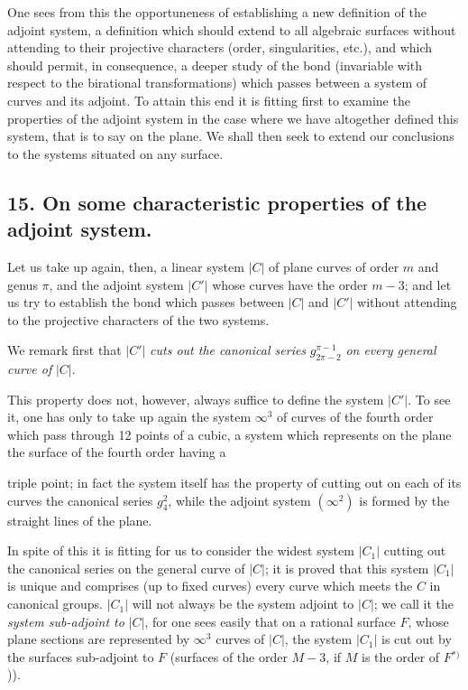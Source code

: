 \documentclass{article}
\begin{document}
One sees from this the opportuneness of establishing a new definition of the adjoint system, a definition which should extend to all algebraic surfaces without attending to their projective characters (order, singularities, etc.), and which should permit, in consequence, a deeper study of the bond (invariable with respect to the birational transformations) which passes between a system of curves and its adjoint. To attain this end it is fitting first to examine the properties of the adjoint system in the case where we have altogether defined this system, that is to say on the plane. We shall then seek to extend our conclusions to the systems situated on any surface.

\subsection*{15. On some characteristic properties of the adjoint system.}

Let us take up again, then, a linear system $|C|$ of plane curves of order $m$ and genus $\pi$, and the adjoint system $|C'|$ whose curves have the order $m-3$; and let us try to establish the bond which passes between $|C|$ and $|C'|$ without attending to the projective characters of the two systems.

We remark first that $|C'|$ \emph{cuts out the canonical series} $g_{2\pi-2}^{\pi-1}$ \emph{on every general curve of} $|C|$.

This property does not, however, always suffice to define the system $|C'|$. To see it, one has only to take up again the system $\infty^{3}$ of curves of the fourth order which pass through 12 points of a cubic, a system which represents on the plane the surface of the fourth order having a

triple point; in fact the system itself has the property of cutting out on each of its curves the canonical series $g_{4}^{2}$, while the adjoint system $(\infty^{2})$ is formed by the straight lines of the plane.

In spite of this it is fitting for us to consider the widest system $|C_{1}|$ cutting out the canonical series on the general curve of $|C|$; it is proved that this system $|C_{1}|$ is unique and comprises (up to fixed curves) every curve which meets the $C$ in canonical groups. $|C_{1}|$ will not always be the system adjoint to $|C|$; we call it the \emph{system sub-adjoint to} $|C|$, for one sees easily that on a rational surface $F$, whose plane sections are represented by $\infty^{3}$ curves of $|C|$, the system $|C_{1}|$ is cut out by the surfaces sub-adjoint to $F$ (surfaces of the order $M-3$, if $M$ is the order of $F$${}^{*)}$)).
\end{document}
